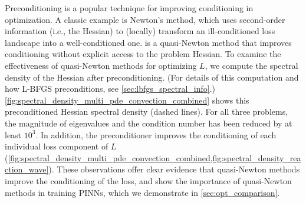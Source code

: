 Preconditioning is a popular technique for improving conditioning in optimization. 
A classic example is Newton's method, which uses second-order information (i.e., the Hessian) to (locally) transform an ill-conditioned loss landscape into a well-conditioned one.
\lbfgs{} is a quasi-Newton method that improves conditioning without explicit access to the problem Hessian. 
To examine the effectiveness of quasi-Newton methods for optimizing $L$, 
we compute the spectral density of the Hessian after \lbfgs{} preconditioning. (For details of this computation and how L-BFGS preconditions, see \cref{sec:lbfgs_spectral_info}.)
\cref{fig:spectral_density_multi_pde_convection_combined} shows this preconditioned Hessian spectral density (dashed lines). 
For all three problems, the magnitude of eigenvalues and the condition number has been reduced by at least $10^3$. 
In addition, the preconditioner improves the conditioning of each individual loss component of $L$ (\cref{fig:spectral_density_multi_pde_convection_combined,fig:spectral_density_reaction_wave}). 
These observations offer clear evidence that quasi-Newton methods improve the conditioning of the loss, and show the importance of quasi-Newton methods in training PINNs, which we demonstrate in \cref{sec:opt_comparison}. 